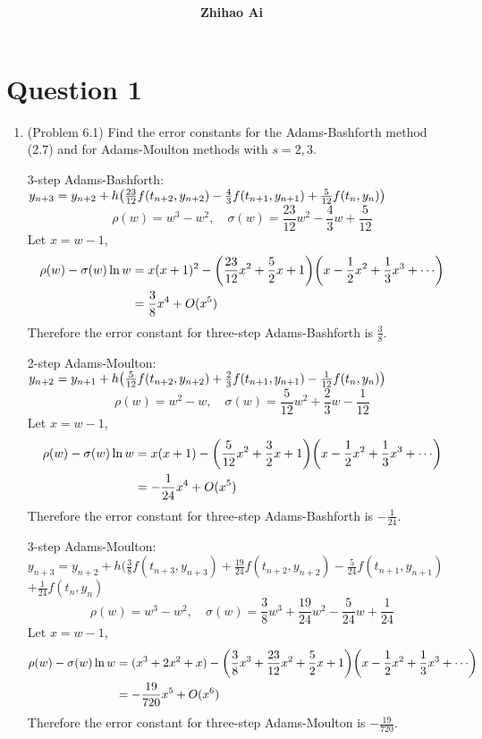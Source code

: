 \documentclass[10pt]{report}
\title{
	\vspace{2in}
	\textmd{\textbf{\hwCourse\\\hwTitle}}\\
	\vspace{0.3in}\large{\textit{\hmwkClassInstructor}}
	\vspace{3in}
}
\author{\textbf{Zhihao Ai}}
\date{}
\DeclarePairedDelimiter\autoparen{(}{)}
\newcommand{\pa}[1]{\autoparen*{#1}}
\begin{document}
\maketitle

\section*{Question 1}
\begin{enumerate}
	\item 
	(Problem 6.1) Find the error constants for the Adams-Bashforth method (2.7) and for Adams-Moulton methods with $s = 2, 3$.
	
	3-step Adams-Bashforth: $y_{n+3} = y_{n+2} + h\pa{ \frac{23}{12}f(t_{n+2}, y_{n+2}) - \frac{4}{3}f(t_{n+1}, y_{n+1}) + \frac{5}{12}f(t_{n}, y_{n})}$
	\[
	\rho(w) = w^3 - w^2,\quad \sigma(w) = \frac{23}{12}w^2 - \frac{4}{3}w + \frac{5}{12}
	\]
	Let $x=w-1$,
	\begin{align*}
	\rho(w) - \sigma(w) \ln{w}
	&= x(x+1)^2 - \pa{\frac{23}{12}x^2 + \frac{5}{2}x + 1} \pa{x-\frac{1}{2}x^2 + \frac{1}{3}x^3 + \cdots}\\
	&= \frac{3}{8}x^4 + O(x^5)
	\end{align*}
	Therefore the error constant for three-step Adams-Bashforth is $\frac{3}{8}$.
	
	2-step Adams-Moulton: $y_{n+2} = y_{n+1} + h\pa{ \frac{5}{12}f(t_{n+2}, y_{n+2}) + \frac{2}{3}f(t_{n+1}, y_{n+1}) - \frac{1}{12}f(t_{n}, y_{n})}$
	\[
	\rho(w) = w^2 - w,\quad \sigma(w) = \frac{5}{12}w^2 + \frac{2}{3}w - \frac{1}{12}
	\]
	Let $x=w-1$,
	\begin{align*}
	\rho(w) - \sigma(w) \ln{w}
	&= x(x+1) - \pa{\frac{5}{12}x^2 + \frac{3}{2}x + 1} \pa{x-\frac{1}{2}x^2 + \frac{1}{3}x^3 + \cdots}\\
	&= -\frac{1}{24}x^4 + O(x^5)
	\end{align*}
	Therefore the error constant for three-step Adams-Bashforth is $-\frac{1}{24}$.

	3-step Adams-Moulton: $y_{n+3} = y_{n+2} + h( \frac{3}{8}f(t_{n+3}, y_{n+3}) + \frac{19}{24}f(t_{n+2}, y_{n+2}) - \frac{5}{24}f(t_{n+1}, y_{n+1})$\\
	$ + \frac{1}{24}f(t_{n}, y_{n})$
	\[
	\rho(w) = w^3 - w^2,\quad \sigma(w) = \frac{3}{8}w^3 + \frac{19}{24}w^2 - \frac{5}{24}w + \frac{1}{24}
	\]
	Let $x=w-1$,
	\begin{align*}
	\rho(w) - \sigma(w) \ln{w}
	&= (x^3 + 2x^2 + x) - \pa{\frac{3}{8}x^3 + \frac{23}{12}x^2 + \frac{5}{2}x + 1} \pa{x-\frac{1}{2}x^2 + \frac{1}{3}x^3 + \cdots}\\
	&= -\frac{19}{720}x^5 + O(x^6)
	\end{align*}
	Therefore the error constant for three-step Adams-Moulton is $-\frac{19}{720}$.
		

\end{enumerate}
\end{document}
